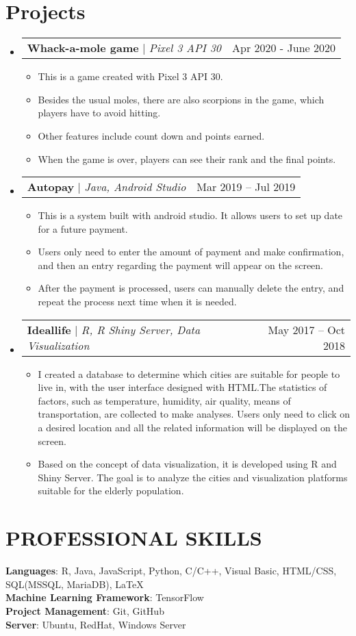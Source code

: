 \documentclass[letterpaper,11pt]{article}
\makeatletter
\newcommand{\resumeItem}[1]{
  \item\small{
    {#1 \vspace{-2pt}}
  }
}
\newcommand{\resumeProjectHeading}[2]{
    \item
    \begin{tabular*}{0.97\textwidth}{l@{\extracolsep{\fill}}r}
      \small#1 & #2 \\
    \end{tabular*}\vspace{-7pt}
}
\newcommand{\resumeSubHeadingListStart}{\begin{itemize}[leftmargin=0.15in, label={}]}
\newcommand{\resumeSubHeadingListEnd}{\end{itemize}}
\newcommand{\resumeItemListStart}{\begin{itemize}}
\newcommand{\resumeItemListEnd}{\end{itemize}\vspace{-5pt}}
\makeatother
\begin{document}
\section{Projects}
    \resumeSubHeadingListStart
      \resumeProjectHeading
          {\textbf{Whack-a-mole game} $|$ \emph{Pixel 3 API 30}}{Apr 2020 - June 2020}
          \resumeItemListStart
            \resumeItem{This is a game created with Pixel 3 API 30.}
            \resumeItem{Besides the usual moles, there are also scorpions in the game, which players have to avoid hitting. }
            \resumeItem{Other features include count down and points earned. }
            \resumeItem{When the game is over, players can see their rank and the final points.}
          \resumeItemListEnd
      \resumeProjectHeading
          {\textbf{Autopay} $|$ \emph{Java, Android Studio}}{Mar 2019 – Jul 2019}
          \resumeItemListStart
            \resumeItem{This is a system built with android studio. It allows users to set up date for a future payment.}
            \resumeItem{Users only need to enter the amount of payment and make confirmation, and then an entry regarding the payment will appear on the screen.}
            \resumeItem{After the payment is processed, users can manually delete the entry, and repeat the process next time when it is needed.}
          \resumeItemListEnd
      \resumeProjectHeading
          {\textbf{Ideallife} $|$ \emph{R, R Shiny Server, Data Visualization }}{May 2017 – Oct 2018}
          \resumeItemListStart
            \resumeItem{I created a database to determine which cities are suitable for people to live in, with the user interface designed with HTML.The statistics of factors, such as temperature, humidity, air quality, means of transportation, are collected to make analyses. Users only need to click on a desired location and all the related information will be displayed on the screen. }
            \resumeItem{Based on the concept of data visualization, it is developed using R and Shiny Server. The goal is to analyze the cities and visualization platforms suitable for the elderly population.}
          \resumeItemListEnd
    \resumeSubHeadingListEnd



%
\section{PROFESSIONAL SKILLS}
 \begin{itemize}[leftmargin=0.15in, label={}]
    \small{\item{
     \textbf{Languages}{: R, Java, JavaScript, Python, C/C++, Visual Basic, HTML/CSS, SQL(MSSQL, MariaDB), LaTeX} \\
     \textbf{Machine Learning Framework}{: TensorFlow}\\
     \textbf{Project Management}{: Git, GitHub}\\
     \textbf{Server}{: Ubuntu, RedHat, Windows Server} 
    }}
 \end{itemize}
\end{document}
